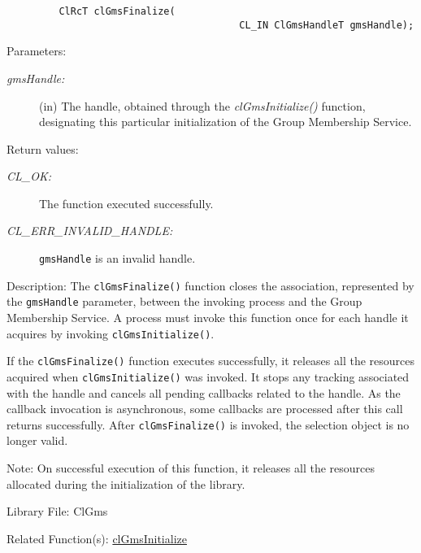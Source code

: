 \begin{flushleft}
\begin{Desc}
\footnotesize\begin{verbatim}         ClRcT clGmsFinalize(
                                		CL_IN ClGmsHandleT gmsHandle);
\end{verbatim}
\normalsize
\end{Desc}
\begin{Desc}
\item[Parameters:]
\begin{description}
\item[{\em gms\-Handle:}](in) The handle, obtained through the \textit{clGmsInitialize()} function, designating this
particular initialization of the Group Membership Service.\end{description}
\end{Desc}
\begin{Desc}
\item[Return values:]
\begin{description}
\item[{\em CL\_\-OK:}]The function executed successfully. 
\item[{\em CL\_\-ERR\_\-INVALID\_\-HANDLE:}]{\tt{gmsHandle}} is an invalid handle.\end{description}
\end{Desc}
\begin{Desc}
\item[Description:]The {\tt{clGmsFinalize()}} function closes the association, represented by the {\tt{gms\-Handle}} parameter,
between the invoking process and the Group Membership Service. A process must invoke this function once for each handle it acquires by invoking
{\tt{clGmsInitialize()}}. \par
 \par
 If the {\tt{clGmsFinalize()}} function executes successfully, it releases all the resources acquired when {\tt{clGmsInitialize()}} was invoked.
 It stops any tracking associated with
 the handle and cancels all pending callbacks related to the handle. As the callback invocation is asynchronous, some callbacks
 are processed after this call returns successfully. After {\tt{clGmsFinalize()}} is invoked, the selection
 object is no longer valid.\end{Desc}
\begin{Desc}
\item[Note:]On successful execution of this function, it releases all the resources allocated during the initialization of the library.\end{Desc}
\begin{Desc}
\item[Library File:]Cl\-Gms\end{Desc}
\begin{Desc}
\item[Related Function(s):]\hyperlink{pagegms101}{cl\-Gms\-Initialize} \end{Desc}
\newpage



\end{flushleft}
